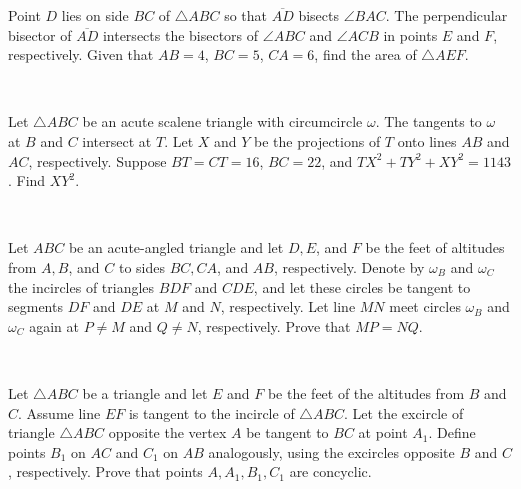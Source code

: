 \documentclass[mast]{lucky}
\begin{document}
\begin{prob}[AIME I 2020/13]{9}
Point $D$ lies on side $BC$ of $\triangle ABC$ so that $\overline{AD}$ bisects $\angle BAC$. The perpendicular bisector of $\overline{AD}$ intersects the bisectors of $\angle ABC$ and $\angle ACB$ in points $E$ and $F$, respectively. Given that $AB=4$, $BC=5$, $CA=6$, find the area of $\triangle AEF$.
\end{prob}\\
\begin{prob}[AIME II 2020/15]{13}
Let $\triangle ABC$ be an acute scalene triangle with circumcircle $\omega$. The tangents to $\omega$ at $B$ and $C$ intersect at $T$. Let $X$ and $Y$ be the projections of $T$ onto lines $AB$ and $AC$, respectively. Suppose $BT=CT=16$, $BC=22$, and $TX^2+TY^2+XY^2=1143$. Find $XY^2$.
\end{prob}\\
\begin{prob}[ISL 2019 G2]{13}
Let $ABC$ be an acute-angled triangle and let $D, E$, and $F$ be the feet of altitudes from $A, B$, and $C$ to sides $BC, CA$, and $AB$, respectively. Denote by $\omega_B$ and $\omega_C$ the incircles of triangles $BDF$ and $CDE$, and let these circles be tangent to segments $DF$ and $DE$ at $M$ and $N$, respectively. Let line $MN$ meet circles $\omega_B$ and $\omega_C$ again at $P \ne M$ and $Q \ne N$, respectively. Prove that $MP = NQ$.
\end{prob}\\
\begin{prob}[MOP 2019 HW]{13}
Let $\triangle ABC$ be a triangle and let $E$ and $F$ be the feet of the altitudes from $B$ and $C$. Assume line $EF$ is tangent to the incircle of $\triangle ABC$. Let the excircle of triangle $\triangle ABC$ opposite the vertex $A$ be tangent to $BC$ at point $A_1$. Define points $B_1$ on $AC$ and $C_1$ on $AB$ analogously, using the excircles opposite $B$ and $C$, respectively. Prove that points $A, A_1, B_1, C_1$ are concyclic.
\end{prob}\\
\end{document}
